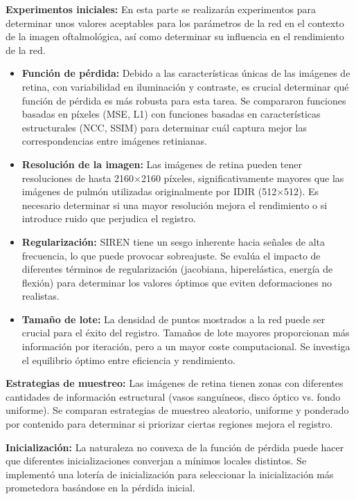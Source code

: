 \textbf{Experimentos iniciales:} En esta parte se realizarán experimentos para determinar unos valores aceptables para los parámetros de la red en el contexto de la imagen oftalmológica,
así como determinar su influencia en el rendimiento de la red.

\begin{itemize}
    \item \textbf{Función de pérdida:} Debido a las características únicas de las imágenes de retina, con variabilidad en iluminación y contraste, es crucial determinar qué función de pérdida es más robusta para esta tarea. Se compararon funciones basadas en píxeles (MSE, L1) con funciones basadas en características estructurales (NCC, SSIM) para determinar cuál captura mejor las correspondencias entre imágenes retinianas.
    \item \textbf{Resolución de la imagen:} Las imágenes de retina pueden tener resoluciones de hasta 2160×2160 píxeles, significativamente mayores que las imágenes de pulmón utilizadas originalmente por IDIR (512×512). Es necesario determinar si una mayor resolución mejora el rendimiento o si introduce ruido que perjudica el registro.
    \item \textbf{Regularización:} SIREN tiene un sesgo inherente hacia señales de alta frecuencia, lo que puede provocar sobreajuste. Se evalúa el impacto de diferentes términos de regularización (jacobiana, hiperelástica, energía de flexión) para determinar los valores óptimos que eviten deformaciones no realistas.
    \item \textbf{Tamaño de lote:} La densidad de puntos mostrados a la red puede ser crucial para el éxito del registro. Tamaños de lote mayores proporcionan más información por iteración, pero a un mayor coste computacional. Se investiga el equilibrio óptimo entre eficiencia y rendimiento.
\end{itemize}

\textbf{Estrategias de muestreo:} Las imágenes de retina tienen zonas con diferentes cantidades de información estructural (vasos sanguíneos, disco óptico vs. fondo uniforme). Se comparan estrategias de muestreo aleatorio, uniforme y ponderado por contenido para determinar si priorizar ciertas regiones mejora el registro.

\textbf{Inicialización:} La naturaleza no convexa de la función de pérdida puede hacer que diferentes inicializaciones converjan a mínimos locales distintos. Se implementó una lotería de inicialización para seleccionar la inicialización más prometedora basándose en la pérdida inicial.

